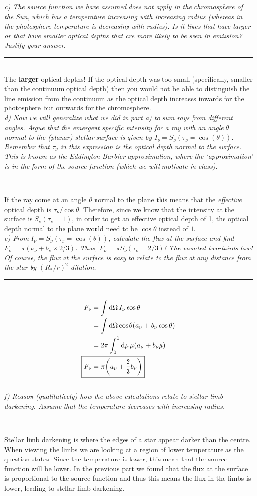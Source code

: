 \documentclass[12pt, letterpaper, twoside]{article}
\newcommand{\answer}[1]{
    \par\noindent\rule{\textwidth}{0.4pt}\\#1\\
}
\begin{document}
{\it c) The source function we have assumed does not apply in the chromosphere of the Sun, which has a temperature increasing with  increasing radius (whereas in the photosphere temperature is decreasing with radius). Is it lines that have larger or that have smaller optical depths that are more likely to be seen in emission? Justify your answer.}

\answer{
    The \textbf{larger} optical depths! If the optical depth was too small (specifically, smaller than the continuum optical depth) then you would not be able to distinguish the line emission from the continuum as the optical depth increases inwards for the photosphere but outwards for the chromosphere.
}

{\it d) Now we will generalize what we did in part a) to sum rays from different angles.  Argue that the emergent specific intensity for a ray with an angle $\theta$ normal to the (planar) stellar surface is given by $I_\nu = S_\nu(\tau_\nu = \cos(\theta))$.  Remember that $\tau_\nu$ in this expression is the optical depth normal to the surface.  This is known as the Eddington-Barbier approximation, where the `approximation' is in the form of the source function (which we will motivate in class).}

\answer{
    If the ray come at an angle $\theta$ normal to the plane this means that the \textit{effective} optical depth is $\tau_\nu / \cos \theta$. Therefore, since we know that the intensity at the surface is $S_\nu(\tau_\nu = 1)$, in order to get an effective optical depth of 1, the optical depth normal to the plane would need to be $\cos \theta$ instead of $1$. 
}

{\it e) From $I_\nu = S_\nu(\tau_\nu = \cos(\theta))$, calculate the flux at the surface and find $F_\nu =  \pi (a_\nu + b_\nu \times 2 /3)$.  Thus, $F_\nu = \pi S_\nu(\tau_\nu = 2/3)$!  The vaunted two-thirds law!  Of course, the flux at the surface is easy to relate to the flux at any distance from the star by $(R_*/r)^2$ dilution.}

\answer{
    \begin{align}
        F_\nu &= \int \dd{\Omega} I_\nu \cos \theta \\
              &= \int \dd{\Omega} \cos \theta \qty(a_\nu + b_\nu \cos \theta) \\
              &= 2 \pi \int_0^1 \dd{\mu} \mu (a_\nu + b_\nu \mu) \\
        \Aboxed {F_\nu &= \pi \qty(a_\nu + \frac{2}{3}b_\nu) }
    \end{align}
}

{\it f) Reason (qualitatively) how the above calculations relate to stellar limb darkening.  Assume that the temperature decreases with increasing radius.}

\answer{
    Stellar limb darkening is where the edges of a star appear darker than the centre. When viewing the limbs we are looking at a region of lower temperature as the question states. Since the temperature is lower, this mean that the source function will be lower. In the previous part we found that the flux at the surface is proportional to the source function and thus this means the flux in the limbs is lower, leading to stellar limb darkening.
}
\end{document}
